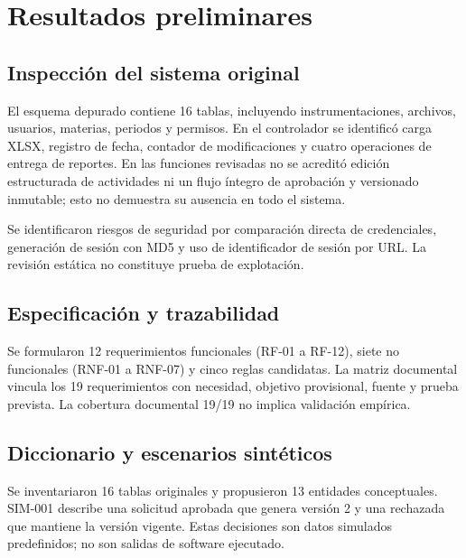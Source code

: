 \section{Resultados preliminares}
\subsection{Inspección del sistema original}
El esquema depurado contiene 16 tablas, incluyendo instrumentaciones, archivos, usuarios, materias, periodos y permisos. En el controlador se identificó carga XLSX, registro de fecha, contador de modificaciones y cuatro operaciones de entrega de reportes. En las funciones revisadas no se acreditó edición estructurada de actividades ni un flujo íntegro de aprobación y versionado inmutable; esto no demuestra su ausencia en todo el sistema.

Se identificaron riesgos de seguridad por comparación directa de credenciales, generación de sesión con MD5 y uso de identificador de sesión por URL. La revisión estática no constituye prueba de explotación.

\subsection{Especificación y trazabilidad}
Se formularon 12 requerimientos funcionales (RF-01 a RF-12), siete no funcionales (RNF-01 a RNF-07) y cinco reglas candidatas. La matriz documental vincula los 19 requerimientos con necesidad, objetivo provisional, fuente y prueba prevista. La cobertura documental 19/19 no implica validación empírica.

\subsection{Diccionario y escenarios sintéticos}
Se inventariaron 16 tablas originales y propusieron 13 entidades conceptuales. SIM-001 describe una solicitud aprobada que genera versión 2 y una rechazada que mantiene la versión vigente. Estas decisiones son datos simulados predefinidos; no son salidas de software ejecutado.
